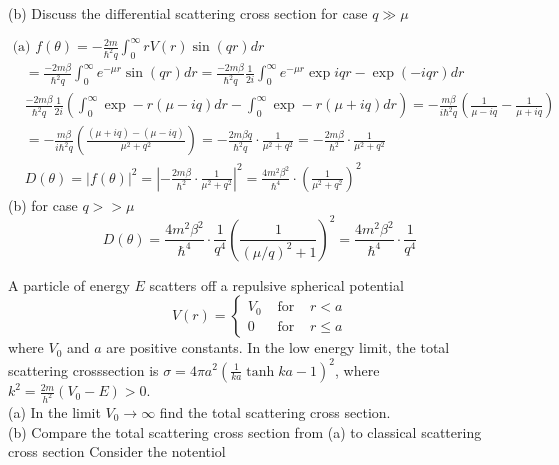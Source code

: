 \begin{enumerate}
\begin{minipage}{\textwidth}
	(b) Discuss the differential scattering cross section for case $q \gg \mu$
\end{minipage}
\begin{answer}
	$\text { (a) } f(\theta)=-\frac{2 m}{\hbar^{2} q} \int_{0}^{\infty} r V(r) \sin (q r) d r$
	\begin{align*}
		&=\frac{-2 m \beta}{\hbar^{2} q} \int_{0}^{\infty} e^{-\mu r} \sin (q r) d r=\frac{-2 m \beta}{\hbar^{2} q} \frac{1}{2 i} \int_{0}^{\infty} e^{-\mu r} \exp i q r-\exp (-i q r) d r \\
		&\frac{-2 m \beta}{\hbar^{2} q} \frac{1}{2 i}\left(\int_{0}^{\infty} \exp -r(\mu-i q) d r-\int_{0}^{\infty} \exp -r(\mu+i q) d r\right)=-\frac{m \beta}{i \hbar^{2} q}\left(\frac{1}{\mu-i q}-\frac{1}{\mu+i q}\right) \\
		&=-\frac{m \beta}{i \hbar^{2} q}\left(\frac{(\mu+i q)-(\mu-i q)}{\mu^{2}+q^{2}}\right)=-\frac{2 m \beta q}{\hbar^{2} q} \cdot \frac{1}{\mu^{2}+q^{2}}=-\frac{2 m \beta}{\hbar^{2}} \cdot \frac{1}{\mu^{2}+q^{2}} \\
		&D(\theta)=|f(\theta)|^{2}=\left|-\frac{2 m \beta}{\hbar^{2}} \cdot \frac{1}{\mu^{2}+q^{2}}\right|^{2}=\frac{4 m^{2} \beta^{2}}{\hbar^{4}} \cdot\left(\frac{1}{\mu^{2}+q^{2}}\right)^{2}
	\end{align*}
	(b) for case $q>>\mu$
	$$
	D(\theta)=\frac{4 m^{2} \beta^{2}}{\hbar^{4}} \cdot \frac{1}{q^{4}}\left(\frac{1}{(\mu / q)^{2}+1}\right)^{2}=\frac{4 m^{2} \beta^{2}}{\hbar^{4}} \cdot \frac{1}{q^{4}}
	$$
\end{answer}
	\begin{minipage}{\textwidth}
	\item A particle of energy $E$ scatters off a repulsive spherical potential
	$$
	V(r)=\left\{\begin{array}{ccc}
	V_{0} & \text { for } & r<a \\
	0 & \text { for } & r \leq a
	\end{array}\right.
	$$
	where $V_{0}$ and $a$ are positive constants. In the low energy limit, the total scattering crosssection is $\sigma=4 \pi a^{2}\left(\frac{1}{k a} \tanh k a-1\right)^{2}$, where $k^{2}=\frac{2 m}{h^{2}}\left(V_{0}-E\right)>0 .$\\
	(a) In the limit $V_{0} \rightarrow \infty$ find the total scattering cross section.\\
	(b) Compare the total scattering cross section from (a) to classical scattering cross section Consider the notentiol
\end{minipage}
\begin{answer}

\end{answer}
\end{enumerate}
